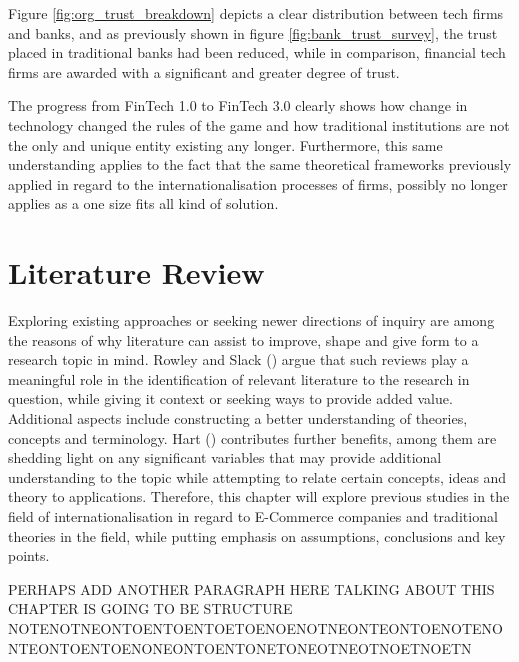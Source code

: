 \documentclass[12pt,a4paper]{article}
\begin{document}
Figure \ref{fig:org_trust_breakdown} depicts a clear distribution between tech firms and banks, and as previously shown in figure \ref{fig:bank_trust_survey}, the trust placed in traditional banks had been reduced, while in comparison, financial tech firms are awarded with a significant and greater degree of trust. \par
The progress from FinTech 1.0 to FinTech 3.0 clearly shows how change in technology changed the rules of the game and how traditional institutions are not the only and unique entity existing any longer. Furthermore, this same understanding applies to the fact that the same theoretical frameworks previously applied in regard to the internationalisation processes of firms, possibly no longer applies as a one size fits all kind of solution. 







\section{Literature Review}
\label{lit_review}
  \vspace{-5mm}
Exploring existing approaches or seeking newer directions of inquiry are among the reasons of why  literature can assist to improve, shape and give form to a research topic in mind. Rowley and Slack (\citeyear{rowleyConductingLiteratureReview2004}) argue that such reviews play a meaningful role in the identification of relevant literature to the research in question, while giving it context or seeking ways to provide added value. Additional aspects include constructing a better understanding of theories, concepts and terminology. Hart (\citeyear{hartDoingLiteratureReview1998}) contributes further benefits, among them are shedding light on any significant variables that may provide additional understanding to the topic while attempting to relate certain concepts, ideas and theory to applications. Therefore, this chapter will explore previous studies in the field of internationalisation in regard to E-Commerce companies and traditional theories  in the field, while putting emphasis on assumptions, conclusions and key points. \par
PERHAPS ADD ANOTHER PARAGRAPH HERE TALKING ABOUT THIS CHAPTER IS GOING TO BE STRUCTURE NOTENOTNEONTOENTOENTOETOENOENOTNEONTEONTOENOTENONTEONTOENTOENONEONTOENTONETONEOTNEOTNOETNOETN
\end{document}
